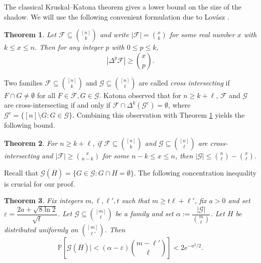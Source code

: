 \documentclass[11pt]{article}
\numberwithin{equation}{section}
\newtheorem{theorem}{Theorem}[section]
\begin{document}
The classical Kruskal--Katona theorem \cite{Kruskal1963, Katona1964} gives a lower bound on the size of the shadow. We will use the following convenient formulation due to Lov\'asz \cite{L79}.

\begin{theorem}\cite{L79}\label{L79}
Let $\mathcal{F} \subseteq \binom{[n]}{k}$ and write $|\mathcal{F}| = \binom{x}{k}$ for some real number $x$ with $k \le x \le n$. Then for any integer $p$ with $0 \le p \le k$,
$$
|\Delta^p \mathcal{F}| \ge \binom{x}{p}.
$$
\end{theorem}

Two families $\mathcal{F} \subseteq \binom{[n]}{k}$ and $\mathcal{G} \subseteq \binom{[n]}{\ell}$ are called \textit{cross intersecting} if $F \cap G \neq \emptyset$ for all $F \in \mathcal{F}, G \in \mathcal{G}$.  Katona \cite{Katona1966} observed that for $n \ge k + \ell$, $\mathcal{F}$ and $\mathcal{G}$ are cross-intersecting if and only if $\mathcal{F} \cap \Delta^k(\mathcal{G}^c) = \emptyset$, where $\mathcal{G}^c = \{[n] \setminus G : G \in \mathcal{G}\}$. Combining this observation with Theorem \ref{L79} yields the following bound.

\begin{theorem}\label{cros}
		For $n\ge k+\ell$, if $\mathcal{F}\subseteq\binom{[n]}{k}$ and $\mathcal{G}\subseteq \binom{[n]}{\ell}$ are cross-intersecting and $|\mathcal{F}|\ge \binom{x}{n-k}$ for some $n-k\leq x\leq n$, then $|\mathcal{G}|\le \binom{n}{\ell}-\binom{x}{\ell}$.
	\end{theorem}


Recall that $\mathcal{G}(\overline{H}) = \{ G \in \mathcal{G} : G \cap H = \emptyset \}$. 
The following concentration inequality is crucial for our proof. 

\begin{theorem}\cite{F23}\label{concen}
		Fix integers $m, \ell, \ell', t$ such that $m \geq t\ell + \ell'$, fix $a > 0$ and set $\varepsilon = \dfrac{2a+\sqrt{8\ln 2}}{\sqrt{t}}$. Let $\mathcal{G} \subseteq \binom{[m]}{\ell}$ be a family and set $\alpha := \dfrac{|\mathcal{G}|}{\binom{m}{\ell}}$. Let $H$ be distributed uniformly on $\binom{[m]}{\ell'}$. Then
		$$
		\mathbb P \left[ \mathcal{G}(\overline{H}) | < (\alpha - \varepsilon) \binom{m - \ell'}{\ell} \right] < 2e^{-a^2/2}. 
		$$
	\end{theorem}
\end{document}

